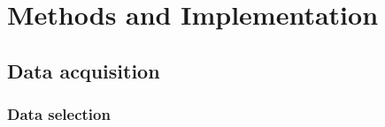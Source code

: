 \documentclass{UoYCSproject}
\begin{document}

\chapter{Methods and Implementation}
\section{Data acquisition}
\subsection{Data selection} %
\end{document}

